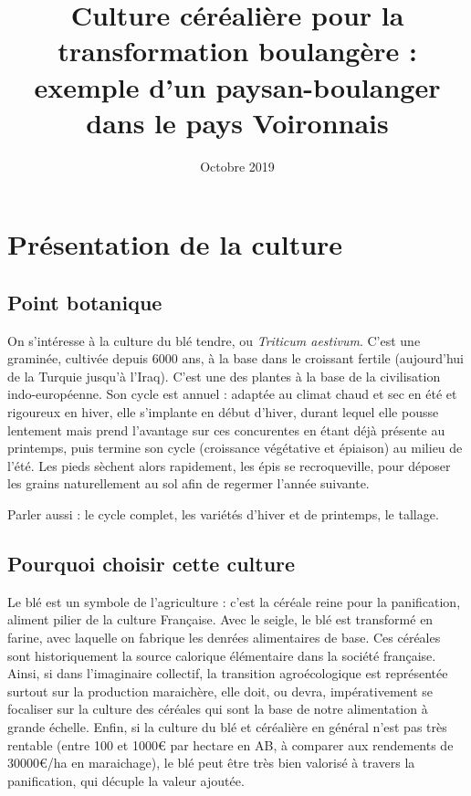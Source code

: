 \documentclass{article}
\title{Culture céréalière pour la transformation boulangère : exemple d'un paysan-boulanger dans le pays Voironnais}
\date{Octobre 2019}
\begin{document}
\maketitle

\section{Présentation de la culture}

\subsection{Point botanique}

On s'intéresse à la culture du blé tendre, ou \textit{Triticum aestivum}. C'est une graminée, cultivée depuis 6000 ans, à la base dans le croissant fertile (aujourd'hui de la Turquie jusqu'à l'Iraq). C'est une des plantes à la base de la civilisation indo-européenne. Son cycle est annuel : adaptée au climat chaud et sec en été et rigoureux en hiver, elle s'implante en début d'hiver, durant lequel elle pousse lentement mais prend l'avantage sur ces concurentes en étant déjà présente au printemps, puis termine son cycle (croissance végétative et épiaison) au milieu de l'été. Les pieds sèchent alors rapidement, les épis se recroqueville, pour déposer les grains naturellement au sol afin de regermer l'année suivante. 

Parler aussi : le cycle complet, les variétés d'hiver et de printemps, le tallage. 

\subsection{Pourquoi choisir cette culture}

Le blé est un symbole de l'agriculture : c'est la céréale reine pour la panification, aliment pilier de la culture Française. Avec le seigle, le blé est transformé en farine, avec laquelle on fabrique les denrées alimentaires de base. Ces céréales sont historiquement la source calorique élémentaire dans la société française. Ainsi, si dans l'imaginaire collectif, la transition agroécologique est représentée surtout sur la production maraichère, elle doit, ou devra, impérativement se focaliser sur la culture des céréales qui sont la base de notre alimentation à grande échelle. Enfin, si la culture du blé et céréalière en général n'est pas très rentable (entre 100 et 1000\euro{} par hectare en AB, à comparer aux rendements de 30000\euro{}/ha en maraichage), le blé peut être très bien valorisé à travers la panification, qui décuple la valeur ajoutée. 
\end{document}
